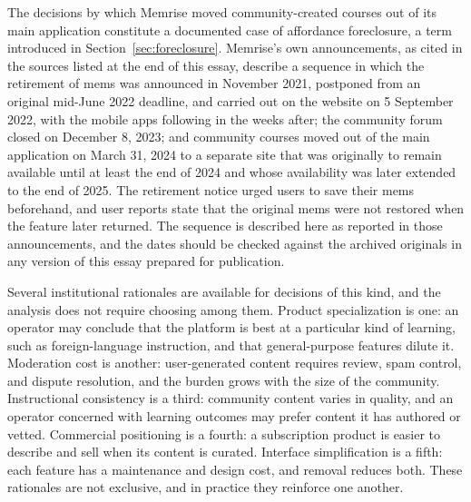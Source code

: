 \documentclass[11pt]{article}
\theoremstyle{remark}
\begin{document}
The decisions by which Memrise moved community-created courses out of its main application constitute a documented case of affordance foreclosure, a term introduced in Section~\ref{sec:foreclosure}. Memrise's own announcements, as cited in the sources listed at the end of this essay, describe a sequence in which the retirement of mems was announced in November 2021, postponed from an original mid-June 2022 deadline, and carried out on the website on 5 September 2022, with the mobile apps following in the weeks after; the community forum closed on December 8, 2023; and community courses moved out of the main application on March 31, 2024 to a separate site that was originally to remain available until at least the end of 2024 and whose availability was later extended to the end of 2025. The retirement notice urged users to save their mems beforehand, and user reports state that the original mems were not restored when the feature later returned. The sequence is described here as reported in those announcements, and the dates should be checked against the archived originals in any version of this essay prepared for publication.

Several institutional rationales are available for decisions of this kind, and the analysis does not require choosing among them. Product specialization is one: an operator may conclude that the platform is best at a particular kind of learning, such as foreign-language instruction, and that general-purpose features dilute it. Moderation cost is another: user-generated content requires review, spam control, and dispute resolution, and the burden grows with the size of the community. Instructional consistency is a third: community content varies in quality, and an operator concerned with learning outcomes may prefer content it has authored or vetted. Commercial positioning is a fourth: a subscription product is easier to describe and sell when its content is curated. Interface simplification is a fifth: each feature has a maintenance and design cost, and removal reduces both. These rationales are not exclusive, and in practice they reinforce one another.
\end{document}
